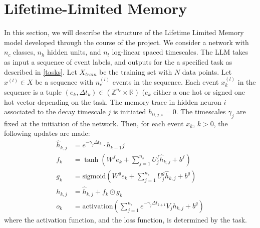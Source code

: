 \chapter{Lifetime-Limited Memory}
\label{llmchap}
In this section, we will describe the structure of the Lifetime Limited Memory model developed through the course of the project. We consider a network with $n_c$ classes, $n_h$ hidden units, and $n_t$ log-linear spaced timescales. The LLM takes as input a sequence of event labels, and outputs for the a specified task as described in \ref{tasks}. Let $X_{train}$ be the training set with $N$ data points. Let $x^{(l)}\in X$ be a sequence with $n_e^{(l)}$ events in the sequence. Each event $x^{(l)}_k$ in the sequence is a tuple $(e_k,\Delta t_k)\in(\mathbb{Z}^{n_c}\times\mathbb{R})$ ($e_k$ either a one hot or signed one hot vector depending on the task. The memory trace in hidden neuron $i$ associated to the decay timescale $j$ is initiated $h_{0,j,i} = 0$. The timescales $\gamma_j$ are fixed at the initiation of the network. Then, for each event $x_k$, $k>0$, the following updates are made:
\begin{align}
    \hat{h}_{k,j} &= e^{-\gamma_j\Delta t_{k}}\cdot h_{k-1}{j}\nonumber
    \\ f_k &= \tanh(W^fe_k+\sum_{j=1}^{n_s}U^f_j\hat{h}_{k,j}+b^f)\nonumber
    \\ g_k &= \text{sigmoid}(W^ge_k+\sum_{j=1}^{n_s}U^g_j\hat{h}_{k,j}+b^g)
    \\ h_{k,j} &= \hat{h}_{k,j} + f_k\odot g_k\nonumber
    \\ o_k &= \text{activation}(\sum_{j=1}^{n_s}e^{-\gamma_j\Delta t_{k+1}}V_j h_{k,j}+b^g)\nonumber
\end{align}
where the activation function, and the loss function, is determined by the task. 
